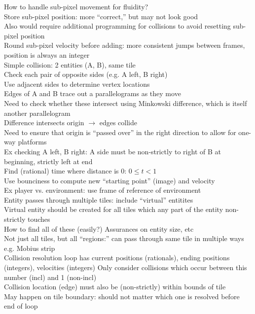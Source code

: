 \documentclass{article}
\begin{document}
How to handle sub-pixel movement for fluidity? \\
Store sub-pixel position: more ``correct,'' but may not look good \\
Also would require additional programming for collisions
to avoid resetting sub-pixel position \\
Round sub-pixel velocity before adding: more consistent jumps between frames,
position is always an integer \\

Simple collision: 2 entities (A, B), same tile \\
Check each pair of opposite sides (e.g. A left, B right) \\
Use adjacent sides to determine vertex locations \\
Edges of A and B trace out a parallelograms as they move \\
Need to check whether these intersect using Minkowski difference,
which is itself another parallelogram \\
Difference intersects origin $\rightarrow$ edges collide \\
Need to ensure that origin is ``passed over'' in the right direction
to allow for one-way platforms \\
Ex checking A left, B right:
A side must be non-strictly to right of B at beginning, strictly left at end \\
Find (rational) time where distance is 0: $0 \leq t < 1$ \\
Use bounciness to compute new ``starting point'' (image) and velocity \\
Ex player vs. environment: use frame of reference of environment \\

Entity passes through multiple tiles: include ``virtual'' entitites \\
Virtual entity should be created for all tiles which any part of the entity
non-strictly touches \\
How to find all of these (easily?) Assurances on entity size, etc \\
Not just all tiles, but all ``regions:'' can pass through same tile in multiple ways
e.g. Mobius strip \\

Collision resolution loop has current positions (rationals),
ending positions (integers), velocities (integers)
Only consider collisions which occur between this number (incl) and 1 (non-incl) \\
Collision location (edge) must also be (non-strictly) within bounds of tile \\
May happen on tile boundary: should not matter which one is resolved before end of loop \\
\end{document}
